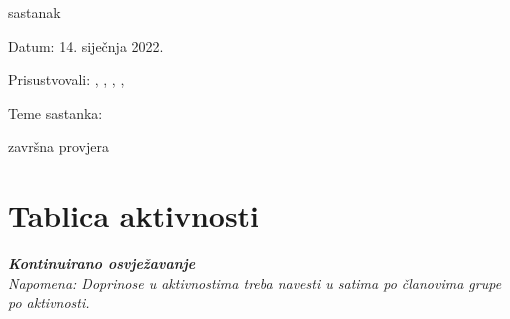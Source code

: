 \begin{packed_enum}
			\item  sastanak	
			\item[] \begin{packed_item}
				\item Datum: 14. siječnja 2022.
				\item Prisustvovali: \prg, \fuc, \ben, \ske, \met
				\item Teme sastanka:
				\begin{packed_item}
					\item  završna provjera
				\end{packed_item}
			\end{packed_item}
			
			
		\end{packed_enum}
		
		\eject
		\section*{Tablica aktivnosti}
		
			\textbf{\textit{Kontinuirano osvježavanje}}\\
			
			 \textit{Napomena: Doprinose u aktivnostima treba navesti u satima po članovima grupe po aktivnosti.}

